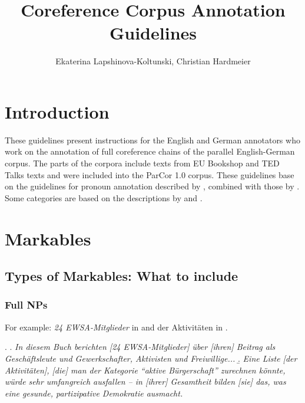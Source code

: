 \documentclass[a4paper]{article}
\title{Coreference Corpus Annotation Guidelines}
\author{Ekaterina Lapshinova-Koltunski, Christian Hardmeier}
\begin{document}
\maketitle
\tableofcontents

\section{Introduction}

These guidelines present instructions for the English and German annotators who work on the annotation of full coreference chains of the parallel English-German corpus. The parts of the corpora include texts from EU Bookshop and TED Talks texts and were included into the
ParCor 1.0 corpus. 
These guidelines base on the guidelines for pronoun annotation described by \cite{GuillouEtAlGuide}, combined with those by \cite{GrishinaStedeGuide}. Some categories are based on the descriptions by \cite{Kunz2012} and \cite{NedoluzhkoMirovsky201}.


\section{Markables}

\subsection{Types of Markables: What to include}

\subsubsection{Full NPs}

For example: {\sl 24 EWSA-Mitglieder} in \Next[a] and {der Aktivitäten} in \Next[b].

\ex.
\a.
{\sl In diesem Buch berichten [24 EWSA-Mitglieder] über [ihren] Beitrag als Geschäftsleute und Gewerkschafter, Aktivisten und Freiwillige...}
\b. {\sl Eine Liste [der Aktivitäten], [die] man der Kategorie ``aktive Bürgerschaft'' zurechnen könnte, würde sehr umfangreich ausfallen -- in [ihrer] Gesamtheit bilden [sie] das, was eine gesunde, partizipative Demokratie ausmacht.}
\end{document}
